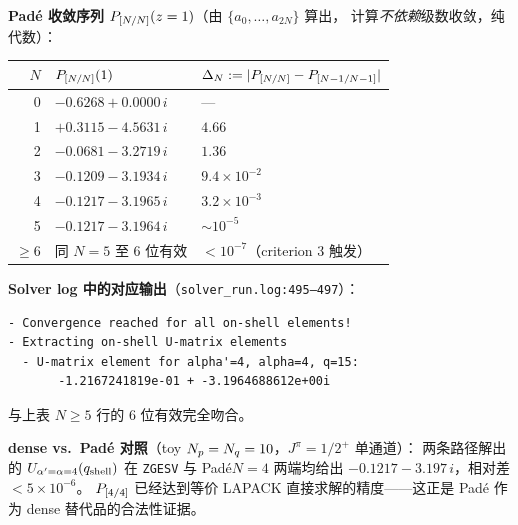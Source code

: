 \begin{numericalbox}
\medskip
\textbf{Padé 收敛序列 \(P_{[N/N]}(z=1)\)}（由 \(\{a_0, \ldots, a_{2N}\}\) 算出，
计算\emph{不依赖}级数收敛，纯代数）：

\medskip
\begin{tabular}{rll}
\toprule
\(N\) & \(P_{[N/N]}(1)\) & \(\Delta_N := |P_{[N/N]} - P_{[N-1/N-1]}|\) \\
\midrule
0 & \(-0.6268 + 0.0000\,i\) & --- \\
1 & \(+0.3115 - 4.5631\,i\) & \(4.66\) \\
2 & \(-0.0681 - 3.2719\,i\) & \(1.36\) \\
3 & \(-0.1209 - 3.1934\,i\) & \(9.4\times 10^{-2}\) \\
4 & \(-0.1217 - 3.1965\,i\) & \(3.2\times 10^{-3}\) \\
5 & \(-0.1217 - 3.1964\,i\) & \(\sim 10^{-5}\) \\
\(\ge 6\) & 同 \(N=5\) 至 6 位有效 & \(< 10^{-7}\)（criterion 3 触发） \\
\bottomrule
\end{tabular}

\textbf{Solver log 中的对应输出}（\texttt{solver\_run.log:495--497}）：
\begin{verbatim}
- Convergence reached for all on-shell elements!
- Extracting on-shell U-matrix elements
  - U-matrix element for alpha'=4, alpha=4, q=15:
       -1.2167241819e-01 + -3.1964688612e+00i
\end{verbatim}
与上表 \(N\ge 5\) 行的 6 位有效完全吻合。

\medskip
\textbf{dense vs.\ Padé 对照}（toy \(N_p=N_q=10\)，\(J^\pi=1/2^+\) 单通道）：
两条路径解出的 \(U_{\alpha'=\alpha=4}(q_{\text{shell}})\) 在 \texttt{ZGESV} 与 Padé\(N=4\)
两端均给出 \(-0.1217 - 3.197\,i\)，相对差 \(< 5 \times 10^{-6}\)。
\(P_{[4/4]}\) 已经达到等价 LAPACK 直接求解的精度——这正是 Padé
作为 dense 替代品的合法性证据。


\end{numericalbox}
